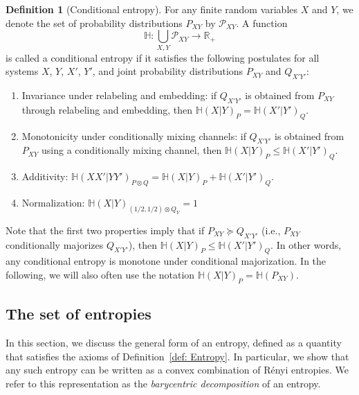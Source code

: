 \documentclass[aps,pra,11pt,onecolumn,nofootinbib,tightenlines]{revtex4-2}
\theoremstyle{definition}
\newtheorem{definition}[theorem]{Definition}
\renewcommand{\H}{\mathbb{H}}
\newcommand{\mc}[1]{\mathcal{#1}}
\begin{document}
\begin{definition}[Conditional entropy]
\label{def: conditional entropy}
For any finite random variables $X$ and $Y$, we denote the set of probability distributions $P_{XY}$ by $\mc P_{XY}$. A function
\begin{equation}
\H : \bigcup_{X, Y} \mc P_{XY} \rightarrow \mathbb{R}_+
\label{eq:cond-ent-gen-def-1st}
\end{equation}
is called a conditional entropy if it satisfies the following postulates for all systems $X$, $Y$, $X'$, $Y'$, and joint probability distributions $P_{XY}$ and $Q_{X'Y'}$:
\begin{enumerate}
    \item Invariance under relabeling and embedding: if $Q_{X'Y'}$ is obtained from $P_{XY}$ through relabeling and embedding, then $\H(X|Y)_P=\H(X'|Y')_Q$.
 \label{eq:QCE-2nd-postulate-iso}
    \item Monotonicity under conditionally mixing channels: if $Q_{X'Y'}$ is obtained from $P_{XY}$ using a conditionally mixing channel, then $\H(X|Y)_P\leq\H(X'|Y')_Q.$
\label{eq:QCE-1st-postulate-mono}
    \item Additivity: $\H(XX'|YY')_{P \otimes Q} = \H(X|Y)_{P} + \H(X'|Y')_{Q}$.
  \label{eq:QCE-3rd-postulate-add}
    \item Normalization: $\H(X|Y)_{(1/2,1/2) \otimes Q_Y} = 1$
     \label{eq:QCE-4-postulate-normalization}
\end{enumerate}
\end{definition}
Note that the first two properties imply that if \(P_{XY} \succeq Q_{X'Y'}\) (i.e., \(P_{XY}\) conditionally majorizes \(Q_{X'Y'}\)), then \(\H(X|Y)_P \leq \H(X'|Y')_Q\). In other words, any conditional entropy is monotone under conditional majorization. In the following, we will
also often use the notation $\H(X|Y)_P=\H(P_{XY})$.

\subsection{The set of entropies}
\label{sec: set of entropies}
In this section, we discuss the general form of an entropy, defined as a quantity that satisfies the axioms of Definition~\ref{def: Entropy}.
In particular, we show that any such entropy can be written as a convex combination of Rényi entropies. We refer to this representation as the \emph{barycentric decomposition} of an entropy.
\end{document}
